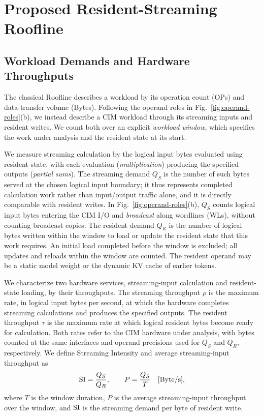 \section{Proposed Resident-Streaming Roofline}
\label{sec:model}
\subsection{Workload Demands and Hardware Throughputs}
The classical Roofline describes a workload by its operation count (OPs) and data-transfer volume (Bytes). Following the operand roles in Fig.~\ref{fig:operand-roles}(b), we instead describe a CIM workload through its streaming inputs and resident writes. We count both over an explicit \emph{workload window}, which specifies the work under analysis and the resident state at its start.

We measure streaming calculation by the logical input bytes evaluated using resident state, with each evaluation (\emph{multiplication}) producing the specified outputs (\emph{partial sums}). The streaming demand $Q_S$ is the number of such bytes served at the chosen logical input boundary; it thus represents completed calculation work rather than input/output traffic alone, and it is directly comparable with resident writes. In Fig.~\ref{fig:operand-roles}(b), $Q_S$ counts logical input bytes entering the CIM I/O and \emph{broadcast} along wordlines (WLs), without counting broadcast copies. The resident demand $Q_R$ is the number of logical bytes written within the window to load or update the resident state that this work requires. An initial load completed before the window is excluded; all updates and reloads within the window are counted. The resident operand may be a static model weight or the dynamic KV cache of earlier tokens.

We characterize two hardware services, streaming-input calculation and resident-state loading, by their throughputs. The streaming throughput $\rho$ is the maximum rate, in logical input bytes per second, at which the hardware completes streaming calculations and produces the specified outputs. The resident throughput $\tau$ is the maximum rate at which logical resident bytes become ready for calculation. Both rates refer to the CIM hardware under analysis, with bytes counted at the same interfaces and operand precisions used for $Q_S$ and $Q_R$, respectively. We define Streaming Intensity and average streaming-input throughput as
\begin{equation}
  \mathrm{SI}=\frac{Q_S}{Q_R},\qquad
  P=\frac{Q_S}{T}\quad[\mathrm{Byte}/\mathrm{s}],
  \label{eq:definitions}
\end{equation}
where $T$ is the window duration, $P$ is the average streaming-input throughput over the window, and $\mathrm{SI}$ is the streaming demand per byte of resident write.

